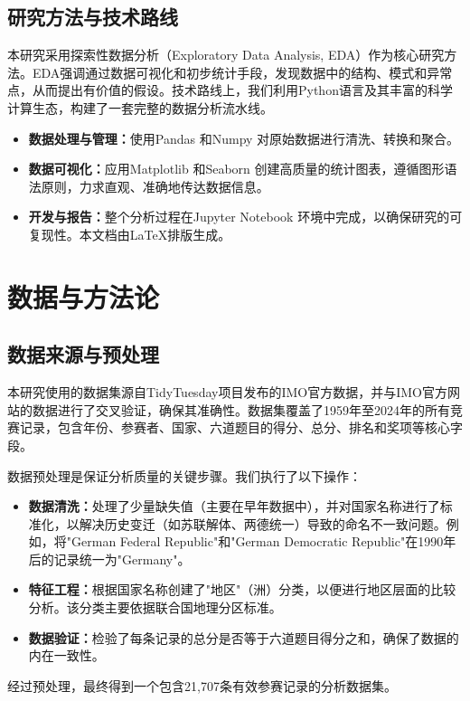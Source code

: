 \documentclass[12pt,a4paper]{article}
\begin{document}
\subsection{研究方法与技术路线}
本研究采用探索性数据分析（Exploratory Data Analysis, EDA）作为核心研究方法\cite{tukey1977exploratory}。EDA强调通过数据可视化和初步统计手段，发现数据中的结构、模式和异常点，从而提出有价值的假设。技术路线上，我们利用Python语言及其丰富的科学计算生态，构建了一套完整的数据分析流水线。
\begin{itemize}
    \item \textbf{数据处理与管理：}使用Pandas\cite{mckinney2010data} 和Numpy\cite{harris2020array} 对原始数据进行清洗、转换和聚合。
    \item \textbf{数据可视化：}应用Matplotlib\cite{hunter2007matplotlib} 和Seaborn\cite{waskom2021seaborn} 创建高质量的统计图表，遵循图形语法原则\cite{wickham2010layered,wilkinson2005grammar}，力求直观、准确地传达数据信息。
    \item \textbf{开发与报告：}整个分析过程在Jupyter Notebook\cite{kluyver2016jupyter} 环境中完成，以确保研究的可复现性。本文档由LaTeX排版生成。
\end{itemize}

\section{数据与方法论}

\subsection{数据来源与预处理}
本研究使用的数据集源自TidyTuesday项目发布的IMO官方数据\cite{tidytuesday_imo}，并与IMO官方网站\cite{imo_official}的数据进行了交叉验证，确保其准确性。数据集覆盖了1959年至2024年的所有竞赛记录，包含年份、参赛者、国家、六道题目的得分、总分、排名和奖项等核心字段。

数据预处理是保证分析质量的关键步骤。我们执行了以下操作：
\begin{itemize}
    \item \textbf{数据清洗：}处理了少量缺失值（主要在早年数据中），并对国家名称进行了标准化，以解决历史变迁（如苏联解体、两德统一）导致的命名不一致问题。例如，将"German Federal Republic"和"German Democratic Republic"在1990年后的记录统一为"Germany"。
    \item \textbf{特征工程：}根据国家名称创建了"地区"（洲）分类，以便进行地区层面的比较分析。该分类主要依据联合国地理分区标准。
    \item \textbf{数据验证：}检验了每条记录的总分是否等于六道题目得分之和，确保了数据的内在一致性。
\end{itemize}
经过预处理，最终得到一个包含21,707条有效参赛记录的分析数据集。
\end{document}
